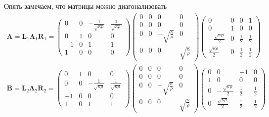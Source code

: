Опять замечаем, что матрицы можно диагонализовать
\begin{gather*}
	\pmb{A} = \pmb{L}_1 \pmb{\Lambda}_1 \pmb{R}_1 = 
	\begin{pmatrix}
    	0 & 0 & -\frac{1}{\sqrt{\kappa\rho}} & \frac{1}{\sqrt{\kappa\rho}} \\
    	0 & 1 & 0 & 0 \\
        -1 & 0 & 1 & 1 \\
    	1 & 0 & 0 & 0
	\end{pmatrix} 
	\begin{pmatrix}
    	0 & 0 & 0 & 0 \\
    	0 & 0 & 0 & 0 \\
        0 & 0 & -\sqrt{\frac{\kappa}{\rho}} & 0 \\
    	0 & 0 & 0 & \sqrt{\frac{\kappa}{\rho}}
	\end{pmatrix} 
	\begin{pmatrix}
    	0 & 0 & 0 & 1 \\
    	0 & 1 & 0 & 0 \\
        -\frac{\sqrt{\kappa\rho}}{2} & 0 & \frac{1}{2} & \frac{1}{2} \\
        \frac{\sqrt{\kappa\rho}}{2} & 0 & \frac{1}{2} & \frac{1}{2}
	\end{pmatrix} \\
	\pmb{B} = \pmb{L}_2 \pmb{\Lambda}_2 \pmb{R}_2 = 
	\begin{pmatrix}
    	0 & 1 & 0 & 0 \\
    	0 & 0 & -\frac{1}{\sqrt{\kappa\rho}} & \frac{1}{\sqrt{\kappa\rho}} \\
    	-1 & 0 & 0 & 0 \\
        1 & 0 & 1 & 1 
	\end{pmatrix} 
	\begin{pmatrix}
    	0 & 0 & 0 & 0 \\
    	0 & 0 & 0 & 0 \\
        0 & 0 & -\sqrt{\frac{\kappa}{\rho}} & 0 \\
    	0 & 0 & 0 & \sqrt{\frac{\kappa}{\rho}}
	\end{pmatrix} 
	\begin{pmatrix}
    	0 & 0 & -1 & 0 \\
    	1 & 0 & 0 & 0 \\
        0 & -\frac{\sqrt{\kappa\rho}}{2} & \frac{1}{2} & \frac{1}{2} \\
        0 & \frac{\sqrt{\kappa\rho}}{2}  & \frac{1}{2} & \frac{1}{2}
	\end{pmatrix} 
\end{gather*}

